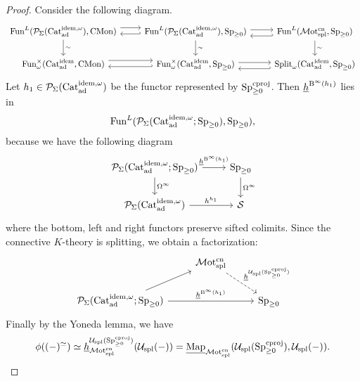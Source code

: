 \documentclass[a4paper,10pt, oneside]{amsart}
\begin{document}
\begin{proof}
	Consider the following diagram.
	$$
	\begin{tikzcd}
		{\funct^L(\mcp_{\Sigma}(\catadidemomega),\cmon)} \arrow[d, "\sim"] \arrow[r, shift left=2] & {\funct^L(\mcp_{\Sigma}(\catadidemomega),\spgeq)} \arrow[l, hook', shift left] \arrow[d, "\sim"] \arrow[r, shift left] & {\funct^L(\motsplcn,\spgeq)} \arrow[l, hook', shift left=2] \arrow[d, "\sim"] \\
		{\funct_\omega^\times(\catadidem,\cmon)} \arrow[r, shift left=2]                                & {\funct_\omega^\times(\catadidem,\spgeq)} \arrow[l, hook', shift left] \arrow[r, shift left]                                & {\Split_\omega(\catadidem,\spgeq)} \arrow[l, hook', shift left=2]               
	\end{tikzcd}$$
	Let $h_1\in \mathcal{P}_{\Sigma}(\mathrm{Cat}_{\mathrm{ad}}^{\mathrm{idem},\omega})$ be the  functor represented by $\operatorname{Sp}_{\geq0}^{\mathrm{cproj}}$. Then $\underline{h}^{\mathrm{B}^\infty(h_1)}$ lies in $$\operatorname{Fun}^L(\mathcal{P}_{\Sigma}(\mathrm{Cat}_{\mathrm{ad}}^{\mathrm{idem},\omega};\operatorname{Sp}_{\geq0}),\operatorname{Sp}_{\geq0}),$$ because we have the following diagram
	$$\begin{tikzcd}
		\mcp_{\Sigma}(\catadidemomega;\spgeq) \arrow[d, "\Omega^\infty"] \arrow[r, "\underline{h}^{\op{B}^\infty(h_1)}"] & \spgeq \arrow[d, "\Omega^\infty"] \\
		\mcp_{\Sigma}(\catadidemomega) \arrow[r, "h^{h_1}"]                                            & \mcs            
	\end{tikzcd}
	$$
	where the bottom, left and right functors preserve sifted colimits. Since the connective $K$-theory is splitting, we obtain a factorization:
	$$\begin{tikzcd}
		& \motsplcn \arrow[rd, "\underline{h}^{\mcu_{\op{spl}}(\spgeqcproj)}", dashed] &        \\
		\mcp_{\Sigma}(\catadidemomega;\spgeq) \arrow[ru] \arrow[rr, "\underline{h}^{\op{B}^\infty (h_1)}"] &                                           & \spgeq
	\end{tikzcd}$$
	Finally by the Yoneda lemma, we have $$\phi((-)^\simeq)\simeq \underline{h}^{\mathcal{U}_{\mathrm{spl}}(\operatorname{Sp}_{\geq0}^{\mathrm{cproj}})}_{\mathcal{M}\mathrm{ot}_{\mathrm{spl}}^{\mathrm{cn}}}(\mathcal{U}_{\mathrm{spl}}(-))=\underline{\operatorname{Map}}_{\mathcal{M}\mathrm{ot}_{\mathrm{spl}}^{\mathrm{cn}}}(\mathcal{U}_{\mathrm{spl}}(\operatorname{Sp}_{\geq0}^{\mathrm{cproj}}),\mathcal{U}_{\mathrm{spl}}(-)).$$
\end{proof}
\end{document}

